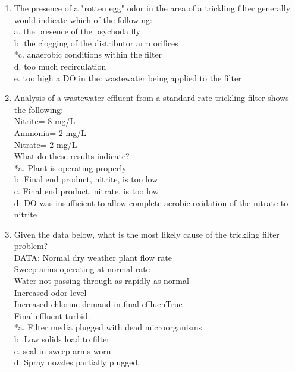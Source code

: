 \begin{enumerate}
\item  The presence of a "rotten egg" odor in the area of a trickling filter generally would indicate which of the following: \\

 a. the presence of the psychoda fly \\
 b. the clogging of the distributor arm orifices \\
 *c. anaerobic conditions within the filter \\
 d. too much recirculation \\
 e. too high a DO in the: wastewater being applied to the filter \\


\item  Analysis of a wastewater effluent from a standard rate trickling filter shows the following:\\
 Nitrite= 8 mg/L \\
 Ammonia= 2 mg/L\\
 Nitrate= 2 mg/L\\
 What do these results indicate? \\

 *a. Plant is operating properly \\
 b. Final end product, nitrite, is too low \\
 c. Final end product, nitrate, is too low \\
 d. DO was insufficient to allow complete aerobic oxidation of the nitrate to nitrite \\


\item  Given the data below, what is the most likely cause of the trickling filter problem? --\\
 DATA: Normal dry weather plant flow rate\\
 Sweep arms operating at normal rate\\
 Water not passing through as rapidly as normal\\
 Increased odor level\\
 Increased chlorine demand in final effluenTrue\\
 Final effluent turbid. \\

 *a. Filter media plugged with dead microorganisms \\
 b. Low solids load to filter \\
 c. seal in sweep arms worn \\
 d. Spray nozzles partially plugged. \\



\end{enumerate}
